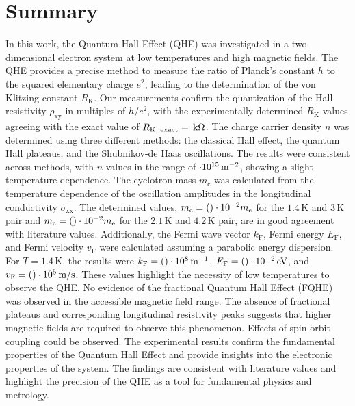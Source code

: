 \section{Summary}

In this work, the Quantum Hall Effect (QHE) was investigated in a two-dimensional electron system 
at low temperatures and high magnetic fields. 
The QHE provides a precise method to measure the ratio of Planck's constant $h$ to the squared elementary charge $e^2$,
leading to the determination of the von Klitzing constant $R_\text{K}$. Our measurements confirm the 
quantization of the Hall resistivity $\rho_\text{xy}$ in multiples of $h/e^2$, with the experimentally 
determined $R_\text{K}$ values agreeing with the exact value of $R_\text{K, exact} = \csname Klitzing1.4K\endcsname\,\text{k}\Omega$.
The charge carrier density $n$ was determined using three different methods: 
the classical Hall effect, the quantum Hall plateaus, and the Shubnikov-de Haas oscillations. 
The results were consistent across methods, with $n$ values in the range of $\csname nEins1.4K\endcsname \cdot 10^{15}\,\text{m}^{-2}$, 
showing a slight temperature dependence.
The cyclotron mass $m_\text{c}$ was calculated from the temperature dependence 
of the oscillation amplitudes in the longitudinal conductivity $\sigma_\text{xx}$. 
The determined values, $m_\text{c} = (\csname cyclotron15\endcsname)\cdot 10^{-2}m_\text{e}$ for the $1.4\,\text{K}$ and $3\,\text{K}$ 
pair and $m_\text{c} = (\csname cyclotron21\endcsname)\cdot 10^{-2}m_\text{e}$ for the $2.1\,\text{K}$ and $4.2\,\text{K}$ pair, 
are in good agreement with literature values.
Additionally, the Fermi wave vector $k_\text{F}$, Fermi energy $E_\text{F}$, and Fermi velocity $v_\text{F}$ 
were calculated assuming a parabolic energy dispersion. For $T = 1.4\,\text{K}$, 
the results were $k_\text{F} = (\csname kFermi1.4K\endcsname) \cdot 10^{8}\,\text{m}^{-1}$, $E_\text{F} = (\csname EFermi1.4K\endcsname)\cdot 10^{-2}\,\text{eV}$, 
and $v_\text{F} = (\csname vFermi1.4K\endcsname) \cdot 10^{5}\,\text{m/s}$. 
These values highlight the necessity of low temperatures to observe the QHE.
No evidence of the fractional Quantum Hall Effect (FQHE) was observed in the accessible magnetic field range. 
The absence of fractional plateaus and corresponding longitudinal resistivity peaks suggests that higher magnetic 
fields are required to observe this phenomenon.
Effects of spin orbit coupling could be observed.
The experimental results confirm the fundamental properties of the Quantum Hall Effect 
and provide insights into the electronic properties of the system. The findings are consistent with literature values and 
highlight the precision of the QHE as a tool for fundamental physics and metrology.
